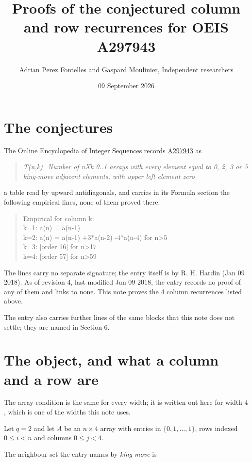 \documentclass[11pt]{article}
\title{Proofs of the conjectured column and row recurrences for OEIS A297943}
\author{Adrian Perez Fontelles and Gaspard Moulinier, Independent researchers}
\date{09 September 2026}
\theoremstyle{definition}
\begin{document}
\maketitle
\section{The conjectures}

The Online Encyclopedia of Integer Sequences records \href{https://oeis.org/A297943}{A297943} as

\begin{quote}\itshape T(n,k)=Number of nXk 0..1 arrays with every element equal to 0, 2, 3 or 5 king-move adjacent elements, with upper left element zero\end{quote}

a table read by upward antidiagonals, and carries in its Formula section the following empirical lines, none of them proved there:

\begin{quote}\ttfamily Empirical for column k:\\
k=1: a(n) = a(n-1)\\k=2: a(n) = a(n-1) +3*a(n-2) -4*a(n-4) for n>5\\k=3: [order 16] for n>17\\k=4: [order 57] for n>59\end{quote}

The lines carry no separate signature; the entry itself is by R. H. Hardin (Jan 09 2018). As of revision 4, last modified Jan 09 2018, the entry records no proof of any of them and links to none. This note proves the 4 column recurrences listed above.

The entry also carries further lines of the same blocks that this note does not settle; they are named in Section 6.

\section{The object, and what a column and a row are}

The array condition is the same for every width; it is written out here for width $4$, which is one of the widths this note uses.

Let $q = 2$ and let $A$ be an $n \times 4$ array with entries in $\{0,1,\dots,1\}$, rows indexed $0 \le i < n$ and columns $0 \le j < 4$.

The neighbour set the entry names by {\itshape king-move} is
\end{document}
